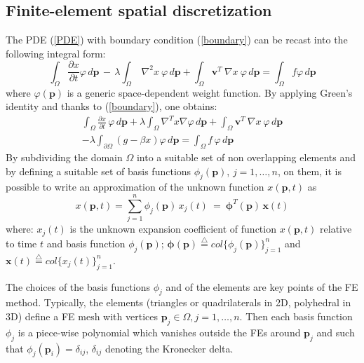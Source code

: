 \documentclass[journal]{IEEEtran}
\newcommand{\defi} { \stackrel{\bigtriangleup}{=} }
\newcommand{\mb}{\mathbf}
\newcommand{\be}{\begin{equation}}
\newcommand{\ee}{\end{equation}}
\newcommand{\bs}{\boldsymbol}
\begin{document}
\subsection{Finite-element spatial discretization}
The PDE (\ref{PDE}) with boundary condition (\ref{boundary}) can be recast into the
	following integral form:
	\[
	\int_\Omega \frac{\partial x}{\partial t} \varphi \, d\mb{p} \, - \,
	\lambda \int_\Omega ~\nabla^2 x~ \varphi \, d\mb{p} +
	\int_\Omega \mb{v}^T  ~\nabla x~ \varphi \, d\mb{p} =
	\int_\Omega f \varphi \, d\mb{p}
	\]
	where $\varphi(\mb{p})$ is a generic space-dependent weight function. 
	By applying Green's identity and thanks to (\ref{boundary}),
	one obtains:
	\begin{multline} \nonumber
	\int_\Omega \frac{\partial x}{\partial t} \, \varphi \, d\mb{p} + \lambda
	\int_\Omega \nabla^T x  \nabla \varphi \, d\mb{p} +
	\int_\Omega \mb{v}^T  ~\nabla x ~\varphi \, d\mb{p} 
	\\  -
	\lambda \int_{\partial \Omega} \left( 
	g -\beta x \right) \varphi \, d\mb{p} 
	=
	\int_\Omega f \, \varphi \, d\mb{p}
	\end{multline}
	By subdividing the domain $\Omega$ into a suitable set of non overlapping
	elements and by defining a suitable set of basis functions
	$\phi_{j} (\mb{p})$,  $j=1,\ldots,n$, on them, it is possible to write an
	approximation of the unknown function $x(\mb{p},t)$ as
	\be
	x(\mb{p},t) = \sum_{j=1}^{n} \phi_{j}(\mb{p}) \, x_j(t) ~=~ \boldsymbol{\phi}^T(\mb{p}) \, \mb{x}(t)
	\label{EXPA}
	\ee
	where: $x_j(t)$ is the unknown expansion coefficient of function $x(\mb{p},t)$
	relative to time $t$ and basis function $\phi_j(\mb{p})$; $\bs{\phi}(\mb{p}) 
	\defi col \{ \phi_j (\mb{p} ) \}_{j=1}^n$ and $\mb{x}(t) \defi col \{ x_j(t)
	\}_{j=1}^n$.
	
	The choices of the basis functions $\phi_{j}$ and of the elements are key
	points of the FE method. Typically, the elements (triangles or quadrilaterals
	in 2D, polyhedral in 3D) define a FE mesh with vertices $\mb{p}_j \in \Omega,
	j=1,\ldots,n $.
	Then each basis function $\phi_{j}$ is a piece-wise polynomial which vanishes
	outside the FEs around $\mb{p}_j$ and such that $\phi_{j}(\mb{p}_i) =
	\delta_{ij}$, $\delta_{ij}$ denoting the Kronecker delta.
	
\end{document}
